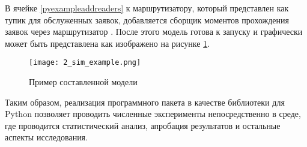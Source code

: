 В ячейке \ref{pyexampleaddreaders} к маршрутизатору, который представлен как тупик для обслуженных заявок, добавляется сборщик моментов прохождения заявок через маршрутизатор . После этого модель готова к запуску и графически может быть представлена как изображено на рисунке \ref{py_example_model}.

\begin{figure}[H]
	\centering
	\texttt{[image: 2\_sim\_example.png]}
	\caption{Пример составленной модели}
	\label{py_example_model}
\end{figure}
 
Таким образом, реализация программного пакета в качестве библиотеки для Python позволяет проводить численные эксперименты непосредственно в среде, где проводится статистический анализ, апробация результатов и остальные аспекты исследования.
\clearpage